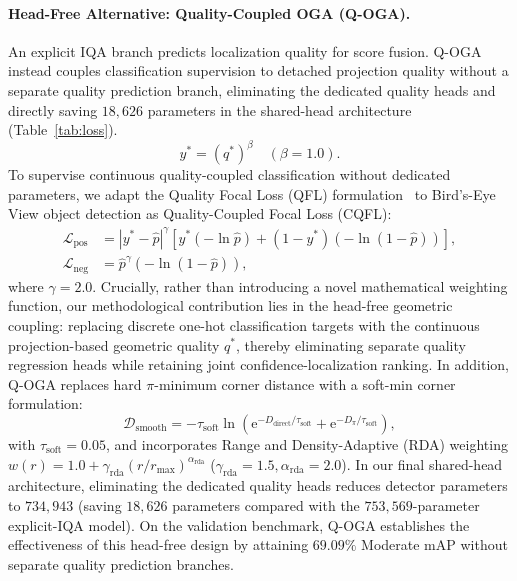 \paragraph{Head-Free Alternative: \textbf{Quality-Coupled OGA} (Q-OGA).}
An explicit IQA branch predicts localization quality for score fusion. Q-OGA instead couples classification supervision to detached projection quality without a separate quality prediction branch, eliminating the dedicated quality heads and directly saving $18{,}626$ parameters in the shared-head architecture (Table~\ref{tab:loss}).
\begin{equation}
    y^* = (q^*)^\beta \quad (\beta = 1.0).
    \label{eq:cqfl_target}
\end{equation}
To supervise continuous quality-coupled classification without dedicated parameters, we adapt the Quality Focal Loss (QFL) formulation~\cite{li2020gfl} to Bird's-Eye View object detection as Quality-Coupled Focal Loss (CQFL):
\begin{align}
    \mathcal{L}_{\mathrm{pos}} &= |y^* - \hat{p}|^\gamma \left[ y^* (-\ln \hat{p}) + (1 - y^*) (-\ln(1 - \hat{p})) \right], \nonumber\\
    \mathcal{L}_{\mathrm{neg}} &= \hat{p}^\gamma (-\ln(1 - \hat{p})),
    \label{eq:cqfl_loss}
\end{align}
where $\gamma = 2.0$. Crucially, rather than introducing a novel mathematical weighting function, our methodological contribution lies in the head-free geometric coupling: replacing discrete one-hot classification targets with the continuous projection-based geometric quality $q^*$, thereby eliminating separate quality regression heads while retaining joint confidence-localization ranking. In addition, Q-OGA replaces hard $\pi$-minimum corner distance with a soft-min corner formulation:
\begin{equation}
    \mathcal{D}_{\mathrm{smooth}} = -\tau_{\mathrm{soft}} \ln\left( \mathrm{e}^{-D_{\mathrm{direct}}/\tau_{\mathrm{soft}}} + \mathrm{e}^{-D_\pi/\tau_{\mathrm{soft}}} \right),
    \label{eq:softmin_corner}
\end{equation}
with $\tau_{\mathrm{soft}} = 0.05$, and incorporates Range and Density-Adaptive (RDA) weighting $w(r) = 1.0 + \gamma_{\mathrm{rda}}(r / r_{\max})^{\alpha_{\mathrm{rda}}}$ ($\gamma_{\mathrm{rda}} = 1.5, \alpha_{\mathrm{rda}} = 2.0$). In our final shared-head architecture, eliminating the dedicated quality heads reduces detector parameters to $734{,}943$ (saving $18{,}626$ parameters compared with the $753{,}569$-parameter explicit-IQA model). On the validation benchmark, Q-OGA establishes the effectiveness of this head-free design by attaining $69.09\%$ Moderate mAP without separate quality prediction branches.

